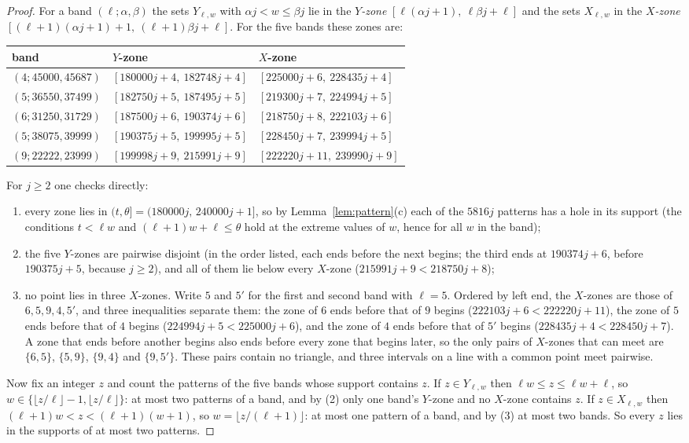 \documentclass[11pt]{amsart}
\theoremstyle{remark}
\begin{document}
\begin{proof}
For a band $(\ell;\alpha,\beta)$ the sets $Y_{\ell,w}$ with $\alpha j<w\le\beta j$ lie in the \emph{$Y$-zone}
$[\ell(\alpha j+1),\ \ell\beta j+\ell]$ and the sets $X_{\ell,w}$ in the \emph{$X$-zone} $[(\ell+1)(\alpha j+1)+1,\ (\ell+1)\beta j+\ell]$.
For the five bands these zones are:
\begin{center}
\small
\begin{tabular}{@{}lll@{}}
\toprule
band & $Y$-zone & $X$-zone\\
\midrule
$(4;45000,45687)$ & $[180000j+4,\ 182748j+4]$ & $[225000j+6,\ 228435j+4]$\\
$(5;36550,37499)$ & $[182750j+5,\ 187495j+5]$ & $[219300j+7,\ 224994j+5]$\\
$(6;31250,31729)$ & $[187500j+6,\ 190374j+6]$ & $[218750j+8,\ 222103j+6]$\\
$(5;38075,39999)$ & $[190375j+5,\ 199995j+5]$ & $[228450j+7,\ 239994j+5]$\\
$(9;22222,23999)$ & $[199998j+9,\ 215991j+9]$ & $[222220j+11,\ 239990j+9]$\\
\bottomrule
\end{tabular}
\end{center}
For $j\ge2$ one checks directly:
\begin{enumerate}
\item every zone lies in $(t,\theta]=(180000j,\,240000j+1]$, so by Lemma~\ref{lem:pattern}(c) each of the $5816j$ patterns has a hole
in its support (the conditions $t<\ell w$ and $(\ell+1)w+\ell\le\theta$ hold at the extreme values of $w$, hence for all $w$ in the band);
\item the five $Y$-zones are pairwise disjoint (in the order listed, each ends before the next begins; the third ends at $190374j+6$, before
$190375j+5$, because $j\ge2$), and all of them lie below every $X$-zone ($215991j+9<218750j+8$);
\item no point lies in three $X$-zones. Write $5$ and $5'$ for the first and second band with $\ell=5$. Ordered by left end, the
$X$-zones are those of $6,5,9,4,5'$, and three inequalities separate them: the zone of $6$ ends before that of $9$ begins
($222103j+6<222220j+11$), the zone of $5$ ends before that of $4$ begins ($224994j+5<225000j+6$), and the zone of $4$ ends before that
of $5'$ begins ($228435j+4<228450j+7$). A zone that ends before another begins also ends before every zone that begins later, so the
only pairs of $X$-zones that can meet are $\{6,5\}$, $\{5,9\}$, $\{9,4\}$ and $\{9,5'\}$. These pairs contain no triangle, and three
intervals on a line with a common point meet pairwise.
\end{enumerate}
Now fix an integer $z$ and count the patterns of the five bands whose support contains $z$. If $z\in Y_{\ell,w}$ then
$\ell w\le z\le\ell w+\ell$, so $w\in\{\lfloor z/\ell\rfloor-1,\lfloor z/\ell\rfloor\}$: at most two patterns of a band, and by (2) only one
band's $Y$-zone and no $X$-zone contains $z$. If $z\in X_{\ell,w}$ then $(\ell+1)w<z<(\ell+1)(w+1)$, so $w=\lfloor z/(\ell+1)\rfloor$: at most
one pattern of a band, and by (3) at most two bands. So every $z$ lies in the supports of at most two patterns.


\end{proof}
\end{document}
